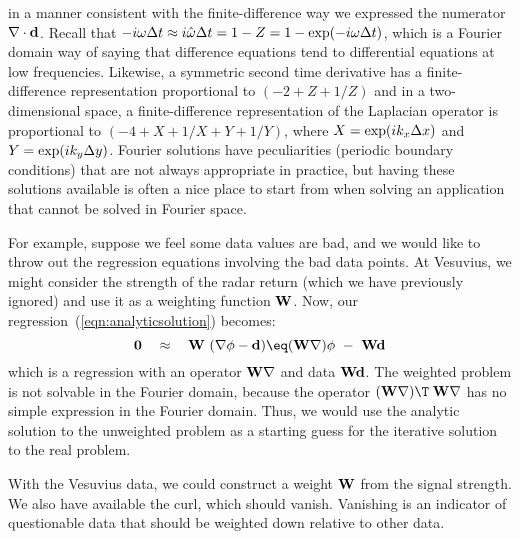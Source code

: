 in a manner consistent with the finite-difference way we expressed the numerator 
$\nabla \cdot {\bf d}$. Recall that $- i\omega \Delta t \approx i
\hat{\omega} \Delta t = 1-Z = 1-{\rm exp}(-i \omega \Delta t)$, 
which is a Fourier 
domain way of saying that difference equations tend to differential equations at low 
frequencies. Likewise, a symmetric second time derivative has a finite-difference 
representation proportional to $(-2+Z+1/Z)$ and in a two-dimensional space, a 
finite-difference representation of the Laplacian operator is proportional to $(-4+X+1/X+Y+1/Y)$, where $X = {\rm exp}(i k_x \Delta x )$ and $Y = {\rm exp}(i k_y \Delta y )$. 
Fourier solutions have peculiarities (periodic boundary conditions) 
that are not always appropriate in practice, but having these solutions available 
is often a nice place to start from when solving an application that cannot be solved 
in Fourier space.

\par
For example, suppose we feel some data values are bad, and we
would like to throw out the regression equations involving the bad data points. At 
Vesuvius, we might consider the strength of the radar return (which we have
previously ignored) and use it as a weighting function ${\bf W}$.
Now, our regression~(\ref{eqn:analyticsolution}) becomes:
\begin{equation}
{\bf 0} \quad \approx\quad
{\bf W} \ (\nabla \phi -{\bf d})
\eq ({\bf W} \nabla) \phi \ -\  {\bf Wd}
\end{equation}
which is a regression with an operator ${\bf W \nabla}$  and 
data ${\bf Wd}$. The weighted problem is not solvable in the Fourier domain, because 
the operator $({\bf W} \nabla )\T\; {\bf W} \nabla$ has no simple
expression in the Fourier domain. 
Thus, 
we would use the analytic solution to the unweighted problem as a starting guess for 
the iterative solution to the real problem. 
\par
With the Vesuvius data, we could construct a weight ${\bf W}$ from the signal strength.
We also have available the curl, which should vanish.
Vanishing is an indicator of questionable data
that should be weighted down relative to other data.


